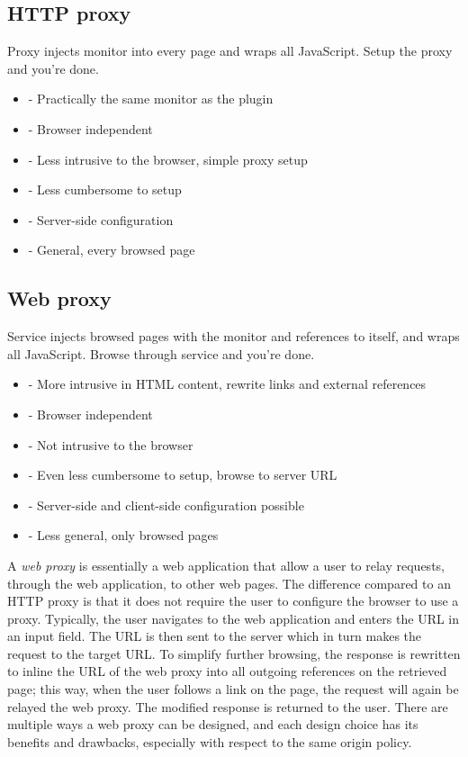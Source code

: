 \documentclass{llncs}
\begin{document}

\subsection{HTTP proxy}

Proxy injects monitor into every page and wraps all JavaScript. Setup the proxy 
and you're done.
\begin{itemize}
\item- Practically the same monitor as the plugin
\item- Browser independent
\item- Less intrusive to the browser, simple proxy setup
\item- Less cumbersome to setup
\item- Server-side configuration
\item- General, every browsed page
\end{itemize}

\subsection{Web proxy}

Service injects browsed pages with the monitor and references to itself, and 
wraps all JavaScript. Browse through service and you're done.
\begin{itemize}
\item- More intrusive in HTML content, rewrite links and external references 
\item- Browser independent
\item- Not intrusive to the browser
\item- Even less cumbersome to setup, browse to server URL
\item- Server-side and client-side configuration possible
\item- Less general, only browsed pages
\end{itemize}


A \emph{web proxy} is essentially a web application that allow a user to relay requests, 
through the web application, to other web pages. The difference compared to an 
HTTP proxy is that it does not require the user to configure the browser to use a 
proxy. Typically, the user navigates to the web application and enters the URL in 
an input field. The URL is then sent to the server which in turn makes the request to the 
target URL. To simplify further 
browsing, the response is rewritten to inline the URL of the web proxy 
into all outgoing references on the retrieved page; this way, when the user 
follows a link on the page, the request will again be relayed the web proxy. 
The modified response is returned to the user. 
There are multiple ways a web proxy can be designed, and each design choice 
has its benefits and drawbacks, especially with respect to the same origin policy.
\end{document}
